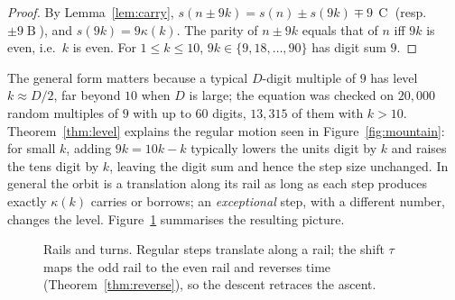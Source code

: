 \documentclass[11pt]{article}
\theoremstyle{definition}
\theoremstyle{remark}
\newcommand{\C}{\operatorname{C}}
\newcommand{\B}{\operatorname{B}}
\begin{document}
\begin{proof}
By Lemma~\ref{lem:carry}, $s(n\pm9k)=s(n)\pm s(9k)\mp9\,\C$ (resp.\ $\pm9\B$),
and $s(9k)=9\kappa(k)$. The parity of $n\pm9k$ equals that of $n$ iff $9k$ is
even, i.e.\ $k$ is even. For $1\le k\le10$, $9k\in\{9,18,\dots,90\}$ has digit
sum $9$.
\end{proof}

The general form matters because a typical $D$-digit multiple of $9$ has level
$k\approx D/2$, far beyond $10$ when $D$ is large; the equation was checked on
$20{,}000$ random multiples of $9$ with up to $60$ digits, $13{,}315$ of them
with $k>10$. Theorem~\ref{thm:level} explains the regular motion seen in
Figure~\ref{fig:mountain}: for small $k$, adding $9k=10k-k$ typically lowers
the units digit by $k$ and raises the tens digit by $k$, leaving the digit sum
and hence the step size unchanged. In general the orbit is a translation along
its rail as long as each step produces exactly $\kappa(k)$ carries or borrows;
an \emph{exceptional} step, with a different number, changes the level.
Figure~\ref{fig:rails} summarises the resulting picture.

\begin{figure}[t]
\centering
{}
\caption{Rails and turns. Regular steps translate along a rail; the shift
$\tau$ maps the odd rail to the even rail and reverses time
(Theorem~\ref{thm:reverse}), so the descent retraces the ascent.}\label{fig:rails}
\end{figure}
\end{document}
